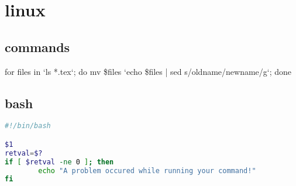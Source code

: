 \section{linux}
\subsection{commands}
for files in `ls *.tex`; do mv \$files `echo \$files | sed s/oldname/newname/g`; done
\subsection{bash}
\begin{lstlisting}[language=sh]
#!/bin/bash

$1
retval=$?
if [ $retval -ne 0 ]; then
        echo "A problem occured while running your command!"
fi
\end{lstlisting}
